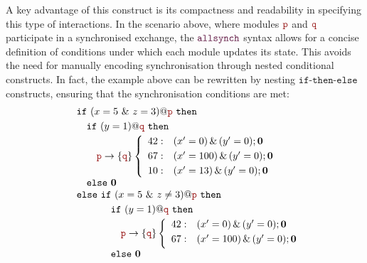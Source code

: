 \begin{itemize}
  
  A key advantage of this construct is its compactness and readability
  in specifying this type of interactions. In the scenario above,
  where modules $\role{p}$ and $\role{q}$ participate in a
  synchronised exchange, the $\allsynchName$ syntax allows for a
  concise definition of conditions under which each module updates its
  state. This avoids the need for manually encoding synchronisation
  through nested conditional constructs.
    In fact, the example above can be
  rewritten by nesting $\mathtt{if\text{-}then\text{-}else}$
  constructs, ensuring that the synchronisation conditions are met:
  \begin{displaymath}
    \begin{array}{ll}
      & \mathtt{if}\ (x=5\ \&\ z=3)@\nr\ \mathtt{then}\\[1mm]
      & \quad \mathtt{if}\ (y=1)@\nrr\ \mathtt{then}\\[1mm]
      & \quad \quad \interactBase{\nr}{\nrr}
        \left\{
        \begin{array}{rlll}
          42 : &  (x'=0)\,\&\,(y'=0);\CEnd \\[1mm]
          67 : &  (x'=100)\,\&\,(y'=0);\CEnd \\[1mm]
          10 : &  (x'=13)\,\&\,(y'=0);\CEnd
        \end{array}
        \right.
      \\
      & \quad \mathtt{else}\ \CEnd \\
      & \mathtt{else}\ \mathtt{if}\ (x=5\ \&\ z\neq3)@\nr\
        \mathtt{then}\\[1mm]
      & \phantom{\mathtt{else}\ }\quad
        \mathtt{if}\ (y=1)@\nrr\ \mathtt{then}\\[1mm]
      & \phantom{\mathtt{else}\ \quad}\quad
        \interactBase{\nr}{\nrr}
        \left\{
        \begin{array}{rlll}
          42 : &  (x'=0)\,\&\,(y'=0);\CEnd \\[1mm]
          67 : &  (x'=100)\,\&\,(y'=0);\CEnd \\[1mm]
        \end{array}
        \right.
      \\
      & \phantom{\mathtt{else}\ }\quad\mathtt{else}\ \CEnd
    \end{array}
  \end{displaymath}


\end{itemize}
